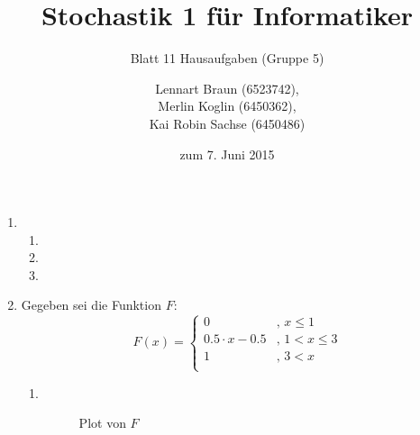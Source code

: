 \documentclass[a4paper]{scrartcl}
\title{Stochastik 1 für Informatiker}
\subtitle{Blatt 11 Hausaufgaben (Gruppe 5)}
\author{
    Lennart Braun (6523742), \\
    Merlin Koglin (6450362), \\
    Kai Robin Sachse (6450486)
}
\date{zum 7. Juni 2015}
\begin{document}
\maketitle

\begin{enumerate}[label=\bfseries\arabic*.]
    \item
        \begin{enumerate}[label=(\alph*)]
            \item

            \item

            \item

        \end{enumerate}

    \item
        Gegeben sei die Funktion $F$:
        \begin{equation*}
            F(x) =
            \begin{cases}
                0 & \text{, } x \leq 1 \\
                \num{0,5} \cdot x - \num{0,5} & \text{, } 1 < x \leq 3 \\
                1 & \text{, } 3 < x \\
            \end{cases}
        \end{equation*}
        \begin{enumerate}[label=(\alph*)]
            \item \hfill \\
                \begin{figure}[H]
                    \centering
                    \caption{Plot von $F$}
                \end{figure}


\end{enumerate}
\end{enumerate}
\end{document}
